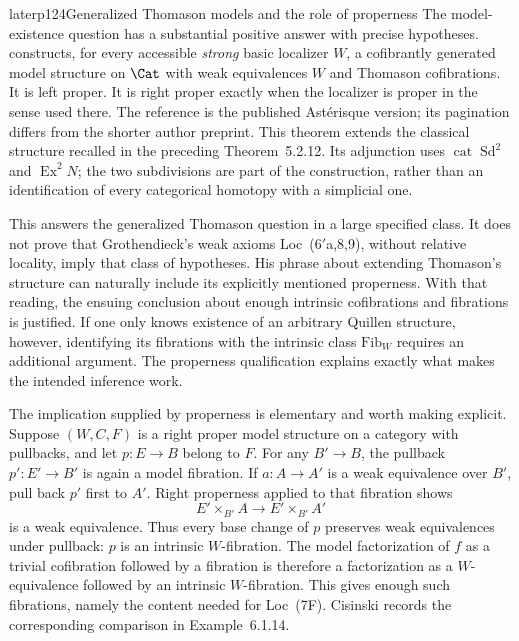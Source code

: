 \begin{dcomment}{later}{p124}{Generalized Thomason models and the role of properness}
The model-existence question has a substantial positive answer with precise hypotheses. \citet[Theorem~5.2.15, p.~225]{Cisinski2006} constructs, for every accessible \emph{strong} basic localizer $W$, a cofibrantly generated model structure on $\Cat$ with weak equivalences $W$ and Thomason cofibrations. It is left proper. It is right proper exactly when the localizer is proper in the sense used there. The reference is the published Ast\'erisque version; its pagination differs from the shorter author preprint. This theorem extends the classical structure recalled in the preceding Theorem~5.2.12. Its adjunction uses $\operatorname{cat}\operatorname{Sd}^2$ and $\operatorname{Ex}^2N$; the two subdivisions are part of the construction, rather than an identification of every categorical homotopy with a simplicial one.

This answers the generalized Thomason question in a large specified class. It does not prove that Grothendieck's weak axioms Loc~(6$'$a,8,9), without relative locality, imply that class of hypotheses. His phrase about extending Thomason's structure can naturally include its explicitly mentioned properness. With that reading, the ensuing conclusion about enough intrinsic cofibrations and fibrations is justified. If one only knows existence of an arbitrary Quillen structure, however, identifying its fibrations with the intrinsic class $\mathrm{Fib}_W$ requires an additional argument. The properness qualification explains exactly what makes the intended inference work.

The implication supplied by properness is elementary and worth making explicit. Suppose $(W,C,F)$ is a right proper model structure on a category with pullbacks, and let $p:E\to B$ belong to $F$. For any $B'\to B$, the pullback $p':E'\to B'$ is again a model fibration. If $a:A\to A'$ is a weak equivalence over $B'$, pull back $p'$ first to $A'$. Right properness applied to that fibration shows
\[
 E'\times_{B'}A\longrightarrow E'\times_{B'}A'
\]
is a weak equivalence. Thus every base change of $p$ preserves weak equivalences under pullback: $p$ is an intrinsic $W$-fibration. The model factorization of $f$ as a trivial cofibration followed by a fibration is therefore a factorization as a $W$-equivalence followed by an intrinsic $W$-fibration. This gives enough such fibrations, namely the content needed for Loc~(7F). Cisinski records the corresponding comparison in Example~6.1.14.


\end{dcomment}
